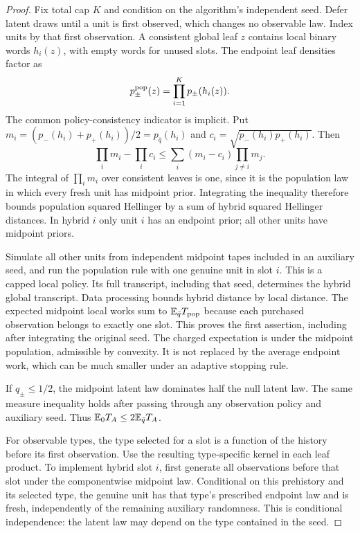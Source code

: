 \begin{proof}
Fix total cap $K$ and condition on the algorithm's independent seed.
Defer latent draws until a unit is first observed, which changes no
observable law. Index units by that first observation. A consistent global leaf $z$
contains local binary words $h_i(z)$, with empty words for unused slots.
The endpoint leaf densities factor as
\[
 p_\pm^{\rm pop}(z)=\prod_{i=1}^K p_\pm(h_i(z)).
\]
The common policy-consistency indicator is implicit. Put
$m_i=(p_-(h_i)+p_+(h_i))/2=p_{\bar q}(h_i)$ and
$c_i=\sqrt{p_-(h_i)p_+(h_i)}$. Then
\[
 \prod_i m_i-\prod_i c_i
 \le\sum_i(m_i-c_i)\prod_{j\ne i}m_j.
\]
The integral of $\prod_i m_i$ over consistent leaves is one, since it
is the population law in which every fresh unit has midpoint prior.
Integrating the inequality therefore bounds population squared Hellinger
by a sum of hybrid squared Hellinger distances. In hybrid $i$ only
unit $i$ has an endpoint prior; all other units have midpoint priors.

Simulate all other units from independent midpoint tapes included in
an auxiliary seed, and run the population rule with one genuine unit
in slot $i$. This is a capped local policy. Its full transcript,
including that seed, determines the hybrid global transcript.
Data processing bounds hybrid distance by local distance. The expected
midpoint local works sum to $\mathbb E_{\bar q}T_{\rm pop}$ because each
purchased observation belongs to exactly one slot. This proves the
first assertion, including after integrating the original seed.
The charged expectation is under the midpoint population, admissible
by convexity. It is not replaced by the average endpoint work, which
can be much smaller under an adaptive stopping rule.

If $q_\pm\le1/2$, the midpoint latent law dominates half the null
latent law. The same measure inequality holds after passing through
any observation policy and auxiliary seed. Thus
$\mathbb E_0T_A\le2\mathbb E_{\bar q}T_A$.

For observable types, the type selected for a slot is a function of the
history before its first observation. Use the resulting type-specific
kernel in each leaf product. To implement hybrid slot $i$, first generate
all observations before that slot under the componentwise midpoint law.
Conditional on this prehistory and its selected type, the genuine unit
has that type's prescribed endpoint law and is fresh, independently of
the remaining auxiliary randomness. This is conditional independence:
the latent law may depend on the type contained in the seed.


\end{proof}

